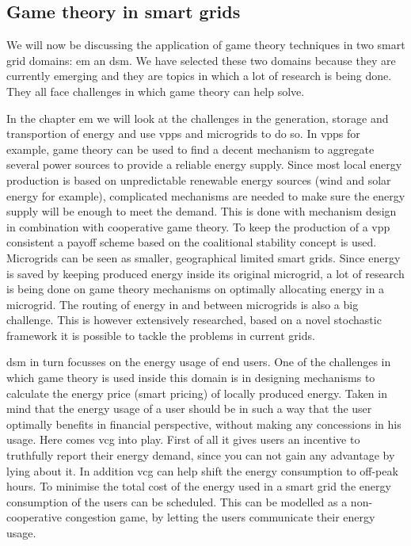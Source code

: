 \subsection{Game theory in smart grids}
We will now be discussing the application of game theory techniques in two smart grid domains: \ac{em} an \ac{dsm}. We have selected these two domains because they are currently emerging and they are topics in which a lot of research is being done. They all face challenges in which game theory can help solve. 

In the chapter \ac{em} we will look at the challenges in the generation, storage and transportion of energy and use \acp{vpp} and microgrids to do so.
In \acp{vpp} for example, game theory can be used to find a decent mechanism to aggregate several power sources to provide a reliable energy supply. Since most local energy production is based on unpredictable renewable energy sources (wind and solar energy for example), complicated mechanisms are needed to make sure the energy supply will be enough to meet the demand. This is done with mechanism design in combination with cooperative game theory. To keep the production of a \ac{vpp} consistent a payoff scheme based on the coalitional stability concept is used.
Microgrids can be seen as smaller, geographical limited smart grids. Since energy is saved by keeping produced energy inside its original microgrid, a lot of research is being done on game theory mechanisms on optimally allocating energy in a microgrid.
The routing of energy in and between microgrids is also a big challenge. This is however extensively researched, based on a novel stochastic framework it is possible to tackle the problems in current grids. 

\ac{dsm} in turn focusses on the energy usage of end users. One of the challenges in which game theory is used inside this domain is in designing mechanisms to calculate the energy price (smart pricing) of locally produced energy. Taken in mind that the energy usage of a user should be in such a way that the user optimally benefits in financial perspective, without making any concessions in his usage. Here comes \ac{vcg} into play. First of all it gives users an incentive to truthfully report their energy demand, since you can not gain any advantage by lying about it. In addition \ac{vcg} can help shift the energy consumption to off-peak hours.  
To minimise the total cost of the energy used in a smart grid the energy consumption of the users can be scheduled. This can be modelled as a non-cooperative congestion game, by letting the users communicate their energy usage.